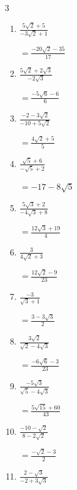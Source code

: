 \begin{multicols}{3}
\begin{enumerate}
        $\displaystyle =\frac{67-14\sqrt{5}}{29}$

  \item $\displaystyle \frac{5\sqrt{2}+5}{-3\sqrt{2}+1}$

        $\displaystyle =\frac{-20\sqrt{2}-35}{17}$

  \item $\displaystyle \frac{5\sqrt{2}+2\sqrt{3}}{-2\sqrt{3}}$

        $\displaystyle =\frac{-5\sqrt{6}-6}{6}$

  \item $\displaystyle \frac{-2-3\sqrt{2}}{-10+5\sqrt{2}}$

        $\displaystyle =\frac{4\sqrt{2}+5}{5}$

\columnbreak %

\resetques

  \item $\displaystyle \frac{\sqrt{5}+6}{-\sqrt{5}+2}$

        $\displaystyle =-17-8\sqrt{5}$

  \item $\displaystyle \frac{5\sqrt{3}+2}{-4\sqrt{3}+8}$

        $\displaystyle =\frac{12\sqrt{3}+19}{4}$

  \item $\displaystyle \frac{3}{4\sqrt{2}+3}$

        $\displaystyle =\frac{12\sqrt{2}-9}{23}$

  \item $\displaystyle \frac{-3}{\sqrt{3}+1}$

        $\displaystyle =\frac{3-3\sqrt{3}}{2}$

  \item $\displaystyle \frac{3\sqrt{2}}{\sqrt{2}-4\sqrt{3}}$

        $\displaystyle =\frac{-6\sqrt{6}-3}{23}$

\columnbreak %

  \item $\displaystyle \frac{-5\sqrt{3}}{\sqrt{5}-4\sqrt{3}}$

        $\displaystyle =\frac{5\sqrt{15}+60}{43}$

  \item $\displaystyle \frac{-10-\sqrt{2}}{8-2\sqrt{2}}$

        $\displaystyle =\frac{-\sqrt{2}-3}{2}$

  \item $\displaystyle \frac{2-\sqrt{3}}{-2+3\sqrt{3}}$


\end{enumerate}
\end{multicols}
